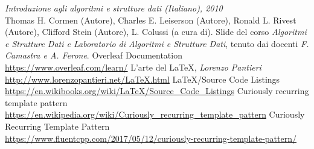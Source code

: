 \def\baselinestretch{1}
\begin{thebibliography}{30}
\textit{Introduzione agli algoritmi e strutture dati (Italiano), 2010}\\
Thomas H. Cormen (Autore),
Charles E. Leiserson (Autore),
Ronald L. Rivest (Autore),
Clifford Stein (Autore),
L. Colussi (a cura di).
 Slide del corso \textit{Algoritmi e Strutture Dati e Laboratorio di Algoritmi e Strutture Dati}, tenuto dai docenti
\textit{F. Camastra e A. Ferone}.
 Overleaf Documentation\\
\url{https://www.overleaf.com/learn/}
 L'arte del \LaTeX, \textit{Lorenzo Pantieri}\\
\url{http://www.lorenzopantieri.net/LaTeX.html}
 \LaTeX/Source Code Listings\\
\url{https://en.wikibooks.org/wiki/LaTeX/Source_Code_Listings}
 Curiously recurring template pattern\\
\url{https://en.wikipedia.org/wiki/Curiously_recurring_template_pattern}
 Curiously Recurring Template Pattern\\
\url{https://www.fluentcpp.com/2017/05/12/curiously-recurring-template-pattern/}
\end{thebibliography}